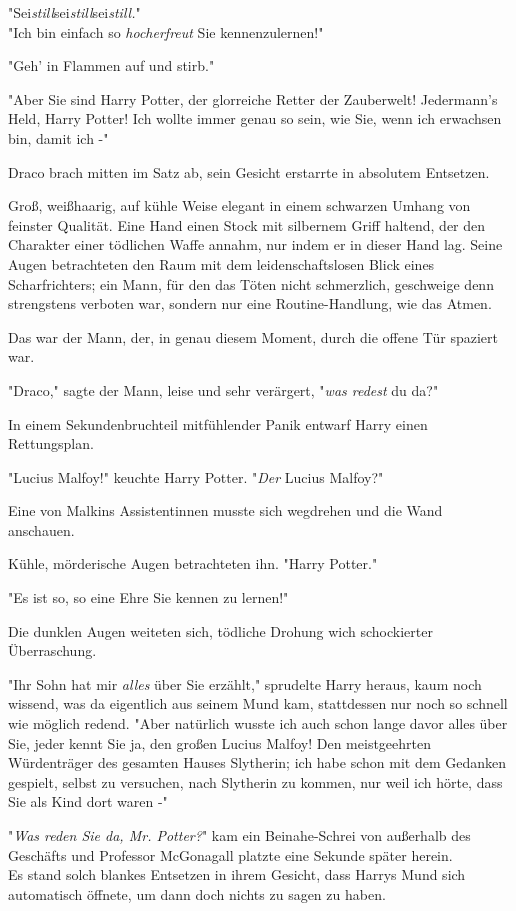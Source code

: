 {"Sei\emph{still}sei\emph{still}sei\emph{still.}"\\ "Ich bin einfach so \emph{hocherfreut} Sie kennenzulernen!"

"Geh' in Flammen auf und stirb."

"Aber Sie sind Harry Potter, der glorreiche Retter der Zauberwelt! Jedermann's Held, Harry Potter! Ich wollte immer genau so sein, wie Sie, wenn ich erwachsen bin, damit ich -"

Draco brach mitten im Satz ab, sein Gesicht erstarrte in absolutem Entsetzen.

Groß, weißhaarig, auf kühle Weise elegant in einem schwarzen Umhang von feinster Qualität. Eine Hand einen Stock mit silbernem Griff haltend, der den Charakter einer tödlichen Waffe annahm, nur indem er in dieser Hand lag. Seine Augen betrachteten den Raum mit dem leidenschaftslosen Blick eines Scharfrichters; ein Mann, für den das Töten nicht schmerzlich, geschweige denn strengstens verboten war, sondern nur eine Routine-Handlung, wie das Atmen.

Das war der Mann, der, in genau diesem Moment, durch die offene Tür spaziert war.

"Draco," sagte der Mann, leise und sehr verärgert, "\emph{was redest} du da?"

In einem Sekundenbruchteil mitfühlender Panik entwarf Harry einen Rettungsplan.

"Lucius Malfoy!" keuchte Harry Potter. "\emph{Der} Lucius Malfoy?"

Eine von Malkins Assistentinnen musste sich wegdrehen und die Wand anschauen.

Kühle, mörderische Augen betrachteten ihn. "Harry Potter."

"Es ist so, so eine Ehre Sie kennen zu lernen!"

Die dunklen Augen weiteten sich, tödliche Drohung wich schockierter Überraschung.

"Ihr Sohn hat mir \emph{alles} über Sie erzählt," sprudelte Harry heraus, kaum noch wissend, was da eigentlich aus seinem Mund kam, stattdessen nur noch so schnell wie möglich redend. "Aber natürlich wusste ich auch schon lange davor alles über Sie, jeder kennt Sie ja, den großen Lucius Malfoy! Den meistgeehrten Würdenträger des gesamten Hauses Slytherin; ich habe schon mit dem Gedanken gespielt, selbst zu versuchen, nach Slytherin zu kommen, nur weil ich hörte, dass Sie als Kind dort waren -"

"\emph{Was reden Sie da, Mr. Potter?}" kam ein Beinahe-Schrei von außerhalb des Geschäfts und Professor McGonagall platzte eine Sekunde später herein.\\ Es stand solch blankes Entsetzen in ihrem Gesicht, dass Harrys Mund sich automatisch öffnete, um dann doch nichts zu sagen zu haben.

}
